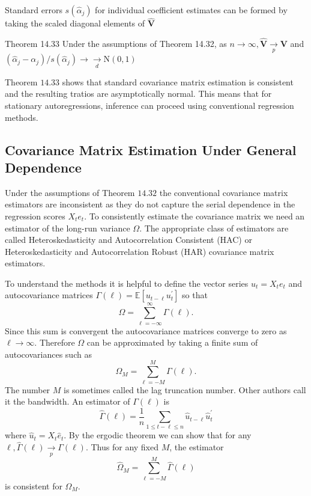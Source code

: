 \documentclass[10pt]{article}
\begin{document}
Standard errors $s\left(\widehat{\alpha}_{j}\right)$ for individual coefficient estimates can be formed by taking the scaled diagonal elements of $\widehat{\boldsymbol{V}}$

Theorem 14.33 Under the assumptions of Theorem 14.32, as $n \rightarrow \infty, \widehat{\boldsymbol{V}} \underset{p}{\rightarrow} \boldsymbol{V}$ and $\left(\widehat{\alpha}_{j}-\alpha_{j}\right) / s\left(\widehat{\alpha}_{j}\right) \longrightarrow \underset{d}{\longrightarrow} \mathrm{N}(0,1)$

Theorem $14.33$ shows that standard covariance matrix estimation is consistent and the resulting tratios are asymptotically normal. This means that for stationary autoregressions, inference can proceed using conventional regression methods.

\subsection{Covariance Matrix Estimation Under General Dependence}
Under the assumptions of Theorem $14.32$ the conventional covariance matrix estimators are inconsistent as they do not capture the serial dependence in the regression scores $X_{t} e_{t}$. To consistently estimate the covariance matrix we need an estimator of the long-run variance $\Omega$. The appropriate class of estimators are called Heteroskedasticity and Autocorrelation Consistent (HAC) or Heteroskedasticity and Autocorrelation Robust (HAR) covariance matrix estimators.

To understand the methods it is helpful to define the vector series $u_{t}=X_{t} e_{t}$ and autocovariance matrices $\Gamma(\ell)=\mathbb{E}\left[u_{t-\ell} u_{t}^{\prime}\right]$ so that
$$
\Omega=\sum_{\ell=-\infty}^{\infty} \Gamma(\ell) .
$$
Since this sum is convergent the autocovariance matrices converge to zero as $\ell \rightarrow \infty$. Therefore $\Omega$ can be approximated by taking a finite sum of autocovariances such as
$$
\Omega_{M}=\sum_{\ell=-M}^{M} \Gamma(\ell) .
$$
The number $M$ is sometimes called the lag truncation number. Other authors call it the bandwidth. An estimator of $\Gamma(\ell)$ is
$$
\widehat{\Gamma}(\ell)=\frac{1}{n} \sum_{1 \leq t-\ell \leq n} \widehat{u}_{t-\ell} \widehat{u}_{t}^{\prime}
$$
where $\widehat{u}_{t}=X_{t} \widehat{e}_{t}$. By the ergodic theorem we can show that for any $\ell, \widehat{\Gamma}(\ell) \underset{p}{\longrightarrow} \Gamma(\ell)$. Thus for any fixed $M$, the estimator
$$
\widehat{\Omega}_{M}=\sum_{\ell=-M}^{M} \widehat{\Gamma}(\ell)
$$
is consistent for $\Omega_{M}$.
\end{document}
